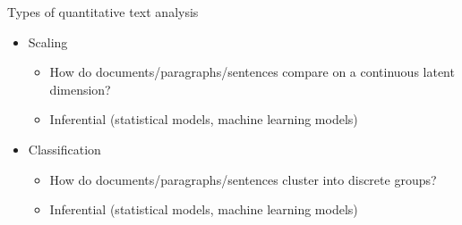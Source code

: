 \documentclass[pdf, 9pt, fleqn, handout]{beamer}
\begin{document}
\begin{frame}{Types of quantitative text analysis}
\begin{itemize}
\item Scaling\\[0.5em]
\begin{itemize}
\item How do documents/paragraphs/sentences compare on a continuous latent dimension?  \\[0.5em]
\item Inferential (statistical models, machine learning models)  \\[2em]
\end{itemize}
\item Classification\\[0.5em]
\begin{itemize}
\item How do documents/paragraphs/sentences cluster into discrete groups? \\[0.5em]
\item Inferential (statistical models, machine learning models)  \\[1em]
\end{itemize}
\end{itemize}
\end{frame}
\end{document}
